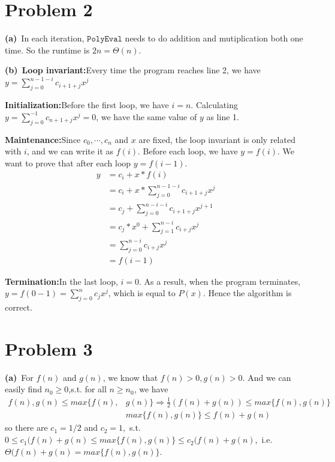 \documentclass[]{article}
\begin{document}
	\section{Problem 2}
	\textbf{(a)}\ In each iteration, $\mathtt{PolyEval}$ needs to do addition and mutiplication both one time. So the runtime is $2n = \Theta(n)$.
	
	\textbf{(b)}\ \textbf{Loop invariant:}Every time the program reaches line 2, we have $y = \sum_{j=0}^{n-1-i}c_{i+1+j}x^{j}$
	
	\textbf{Initialization:}Before the first loop, we have $i = n$. Calculating $y = \sum_{j=0}^{-1}c_{n+1+j}x^{j} = 0$, we have the same value of $y$ as line 1.
	
	\textbf{Maintenance:}Since $c_0,\cdots,c_n$ and $x$ are fixed, the loop invariant is only related with $i$, and we can write it as $f(i)$. Before each loop, we have $y = f(i)$. We want to prove that after each loop  $y = f(i-1)$. 
	\begin{equation*}
		\begin{aligned}
		y &= c_i + x*f(i)\\
		&= c_i + x*\sum_{j=0}^{n-1-i}c_{i+1+j}x^{j}\\
		&= c_j + \sum_{j=0}^{n-i-i}c_{i+1+j}x^{j+1}\\
		&= c_j*x^0 + \sum_{j=1}^{n-i}c_{i+j}x^j\\
		&=\sum_{j=0}^{n-i}c_{i+j}x^j\\
		&=f(i-1) 
		\end{aligned}
	\end{equation*}
	
	\textbf{Termination:}In the last loop, $i = 0$. As a result, when the program terminates, $y = f(0-1) = \sum_{j=0}^{n}c_jx^j$, which is equal to $P(x)$. Hence the algorithm is correct.
	\section{Problem 3}
	\textbf{(a)}\ For $f(n)$ and $g(n)$, we know that $f(n)>0, g(n)>0$. And we can easily find $n_0\geq 0$,s.t. for all $n\geq n_0$, we have
	\begin{equation*}
	\begin{aligned}
	f(n),g(n)\leq max\{f(n),&g(n)\}\Rightarrow \frac{1}{2}(f(n)+g(n))\leq max\{f(n),g(n)\}\\
	&max\{f(n),g(n)\}\leq f(n)+g(n)
	\end{aligned}
	\end{equation*}
	so there are $c_1=1/2$ and $c_2=1$,\ s.t.$0\leq c_1(f(n)+g(n)\leq max\{f(n),g(n)\}\leq c_2(f(n)+g(n)$,\ i.e.$\Theta(f(n)+g(n)=max\{f(n),g(n)\}$.
	
\end{document}
